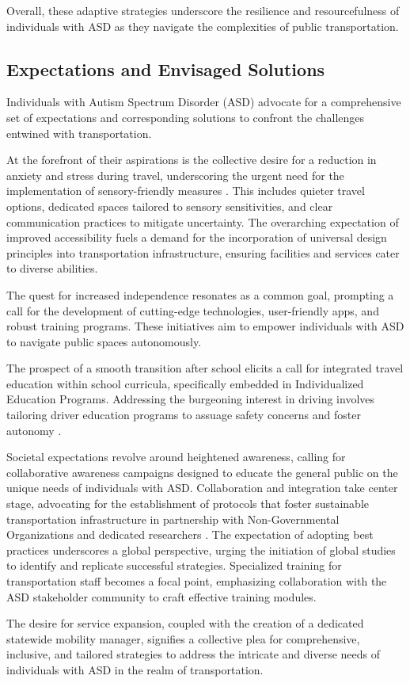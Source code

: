    Overall, these adaptive strategies underscore the resilience and resourcefulness of individuals with ASD as they navigate the complexities of public transportation.

\subsection{Expectations and Envisaged Solutions}

    Individuals with Autism Spectrum Disorder (ASD) advocate for a comprehensive set of expectations and corresponding solutions to confront the challenges entwined with transportation. 
    
    At the forefront of their aspirations is the collective desire for a reduction in anxiety and stress during travel, underscoring the urgent need for the implementation of sensory-friendly measures \cite{deka_co-principal_nodate}. This includes quieter travel options, dedicated spaces tailored to sensory sensitivities, and clear communication practices to mitigate uncertainty.
    The overarching expectation of improved accessibility fuels a demand for the incorporation of universal design principles into transportation infrastructure, ensuring facilities and services cater to diverse abilities.
    
    The quest for increased independence resonates as a common goal, prompting a call for the development of cutting-edge technologies, user-friendly apps, and robust training programs. These initiatives aim to empower individuals with ASD to navigate public spaces autonomously. 
    
    The prospect of a smooth transition after school elicits a call for integrated travel education within school curricula, specifically embedded in Individualized Education Programs. 
    Addressing the burgeoning interest in driving involves tailoring driver education programs to assuage safety concerns and foster autonomy \cite{deka_co-principal_nodate}. 
    
    Societal expectations revolve around heightened awareness, calling for collaborative awareness campaigns designed to educate the general public on the unique needs of individuals with ASD. Collaboration and integration take center stage, advocating for the establishment of protocols that foster sustainable transportation infrastructure in partnership with Non-Governmental Organizations and dedicated researchers \cite{deka_co-principal_nodate}. 
    The expectation of adopting best practices underscores a global perspective, urging the initiation of global studies to identify and replicate successful strategies. Specialized training for transportation staff becomes a focal point, emphasizing collaboration with the ASD stakeholder community to craft effective training modules. 

    The desire for service expansion, coupled with the creation of a dedicated statewide mobility manager, signifies a collective plea for comprehensive, inclusive, and tailored strategies to address the intricate and diverse needs of individuals with ASD in the realm of transportation.
